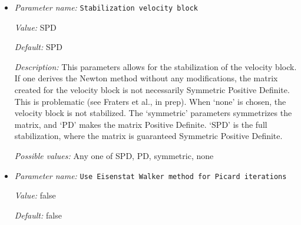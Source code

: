 \begin{itemize}
{\it Value:} SPD


{\it Default:} SPD


{\it Description:} This parameters allows for the stabilization of the preconditioner. If one derives the Newton method without any modifications, the matrix created for the preconditioning is not necessarily Symmetric Positive Definite. This is problematic (see Fraters et al., in prep). When `none' is chosen, the preconditioner is not stabilized. The `symmetric' parameters symmetrizes the matrix, and `PD' makes the matrix Positive Definite. `SPD' is the full stabilization, where the matrix is guaranteed Symmetric Positive Definite.


{\it Possible values:} Any one of SPD, PD, symmetric, none
\item {\it Parameter name:} {\tt Stabilization velocity block}
\label{parameters:Solver parameters/Newton solver parameters/Stabilization velocity block}


{\it Value:} SPD


{\it Default:} SPD


{\it Description:} This parameters allows for the stabilization of the velocity block. If one derives the Newton method without any modifications, the matrix created for the velocity block is not necessarily Symmetric Positive Definite. This is problematic (see Fraters et al., in prep). When `none' is chosen, the velocity block is not stabilized. The `symmetric' parameters symmetrizes the matrix, and `PD' makes the matrix Positive Definite. `SPD' is the full stabilization, where the matrix is guaranteed Symmetric Positive Definite.


{\it Possible values:} Any one of SPD, PD, symmetric, none
\item {\it Parameter name:} {\tt Use Eisenstat Walker method for Picard iterations}
\label{parameters:Solver parameters/Newton solver parameters/Use Eisenstat Walker method for Picard iterations}


{\it Value:} false


{\it Default:} false



\end{itemize}

